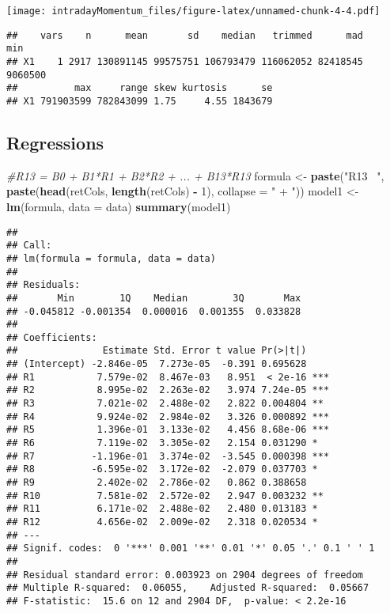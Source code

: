 \documentclass[]{article}
\newenvironment{Shaded}{\begin{snugshade}}{\end{snugshade}}
\newcommand{\CommentTok}[1]{\textcolor[rgb]{0.56,0.35,0.01}{\textit{#1}}}
\newcommand{\DataTypeTok}[1]{\textcolor[rgb]{0.13,0.29,0.53}{#1}}
\newcommand{\DecValTok}[1]{\textcolor[rgb]{0.00,0.00,0.81}{#1}}
\newcommand{\KeywordTok}[1]{\textcolor[rgb]{0.13,0.29,0.53}{\textbf{#1}}}
\newcommand{\NormalTok}[1]{#1}
\newcommand{\OperatorTok}[1]{\textcolor[rgb]{0.81,0.36,0.00}{\textbf{#1}}}
\newcommand{\StringTok}[1]{\textcolor[rgb]{0.31,0.60,0.02}{#1}}
\begin{document}
\texttt{[image: intradayMomentum\_files/figure-latex/unnamed-chunk-4-4.pdf]}

\begin{verbatim}
##    vars    n      mean       sd    median   trimmed      mad     min
## X1    1 2917 130891145 99575751 106793479 116062052 82418545 9060500
##          max     range skew kurtosis      se
## X1 791903599 782843099 1.75     4.55 1843679
\end{verbatim}

\hypertarget{regressions}{%
\subsection{Regressions}\label{regressions}}

\begin{Shaded}
\begin{Highlighting}[]
\CommentTok{#R13 = B0 + B1*R1 + B2*R2 + ... + B13*R13}
\NormalTok{formula <-}\StringTok{ }\KeywordTok{paste}\NormalTok{(}\StringTok{"R13 ~"}\NormalTok{, }\KeywordTok{paste}\NormalTok{(}\KeywordTok{head}\NormalTok{(retCols, }\KeywordTok{length}\NormalTok{(retCols) }\OperatorTok{-}\StringTok{ }\DecValTok{1}\NormalTok{), }\DataTypeTok{collapse =} \StringTok{" + "}\NormalTok{))}
\NormalTok{model1 <-}\StringTok{ }\KeywordTok{lm}\NormalTok{(formula, }\DataTypeTok{data =}\NormalTok{ data)}
\KeywordTok{summary}\NormalTok{(model1)}
\end{Highlighting}
\end{Shaded}

\begin{verbatim}
## 
## Call:
## lm(formula = formula, data = data)
## 
## Residuals:
##       Min        1Q    Median        3Q       Max 
## -0.045812 -0.001354  0.000016  0.001355  0.033828 
## 
## Coefficients:
##               Estimate Std. Error t value Pr(>|t|)    
## (Intercept) -2.846e-05  7.273e-05  -0.391 0.695628    
## R1           7.579e-02  8.467e-03   8.951  < 2e-16 ***
## R2           8.995e-02  2.263e-02   3.974 7.24e-05 ***
## R3           7.021e-02  2.488e-02   2.822 0.004804 ** 
## R4           9.924e-02  2.984e-02   3.326 0.000892 ***
## R5           1.396e-01  3.133e-02   4.456 8.68e-06 ***
## R6           7.119e-02  3.305e-02   2.154 0.031290 *  
## R7          -1.196e-01  3.374e-02  -3.545 0.000398 ***
## R8          -6.595e-02  3.172e-02  -2.079 0.037703 *  
## R9           2.402e-02  2.786e-02   0.862 0.388658    
## R10          7.581e-02  2.572e-02   2.947 0.003232 ** 
## R11          6.171e-02  2.488e-02   2.480 0.013183 *  
## R12          4.656e-02  2.009e-02   2.318 0.020534 *  
## ---
## Signif. codes:  0 '***' 0.001 '**' 0.01 '*' 0.05 '.' 0.1 ' ' 1
## 
## Residual standard error: 0.003923 on 2904 degrees of freedom
## Multiple R-squared:  0.06055,    Adjusted R-squared:  0.05667 
## F-statistic:  15.6 on 12 and 2904 DF,  p-value: < 2.2e-16
\end{verbatim}
\end{document}
